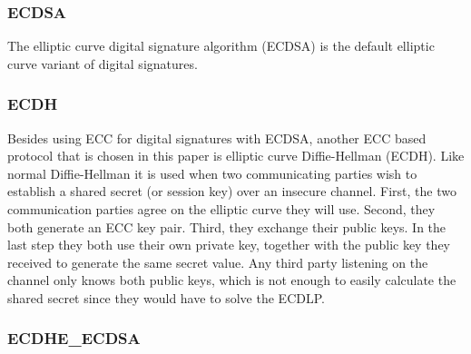\subsubsection{ECDSA} 
\label{subsubsec:ecdsa}

The elliptic curve digital signature algorithm (ECDSA) is the default elliptic curve variant of digital signatures. 

\subsubsection{ECDH} 
\label{subsubsec:ecdh}

Besides using ECC for digital signatures with ECDSA, another ECC based protocol that is chosen in this paper is elliptic curve Diffie-Hellman (ECDH). Like normal Diffie-Hellman it is used when two communicating parties wish to establish a shared secret (or session key) over an insecure channel. First, the two communication parties agree on the elliptic curve they will use. Second, they both generate an ECC key pair. Third, they exchange their public keys. In the last step they both use their own private key, together with the public key they received to generate the same secret value. Any third party listening on the channel only knows both public keys, which is not enough to easily calculate the shared secret since they would have to solve the ECDLP.

\subsubsection{ECDHE\_ECDSA} 
\label{subsubsec:ecdh_ecdsa}

